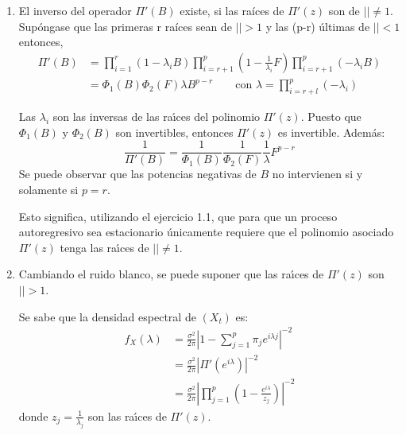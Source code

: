 \begin{observacion}
 
\begin{enumerate}
\item El inverso del operador $\Pi'(B)$ existe, si las ra\'{i}ces de $\Pi'(z)$ son de $\left| \right|\ne 1$. Sup\'{o}ngase que las primeras r ra\'{i}ces sean de $\left| \right|>1$ y las (p-r) \'{u}ltimas de $\left| \right|<1$
entonces, 
\begin{align*}
 \Pi'(B)
	 &=\prod_{i=1}^{r} (1-\lambda_{i} B)\prod_{i=r+1}^{p} \left( {1-\frac{1}{\lambda_{i} }F} \right)\prod_{i=r+1}^{p} (-\lambda_{i} B)\\
	 &=\Phi_{1} \left( B \right)\Phi_{2} (F)\lambda B^{p-r}\qquad\text{con }\lambda 
=\prod_{i=r+l}^{p} \left( {-\lambda_{i} } \right)
\end{align*}

Las $\lambda_{i}$ son las inversas de las ra\'{\i}ces del polinomio 
${\Pi }'\left( z \right)$. Puesto que $\Phi_{1} (B)$ y $\Phi_{2} 
(B)$ son invertibles, entonces $\Pi'(z)$ es invertible. Adem\'{a}s:
\[
\frac{1}{\Pi'(B)}=\frac{1}{\Phi_{1} (B)}\frac{1}{\Phi_{2} 
(F)}\frac{1}{\lambda }F^{p-r}
\]
Se puede observar que las potencias negativas de $B$ no intervienen si y 
solamente si $p=r$.

Esto significa, utilizando el ejercicio 1.1, que para que un proceso 
autoregresivo sea estacionario \'{u}nicamente requiere que el polinomio 
asociado ${\Pi }'\left( z \right)$ tenga las ra\'{\i}ces de 
$\left| \right|\ne 1$.

\item Cambiando el ruido blanco, se puede suponer que las ra\'{\i}ces de $\Pi'(z)$ son $\left| \right|>1$.

Se sabe que la densidad espectral de $(X_{{t}})$ es:
\begin{align*}
 f_{X} (\lambda )
	 &=\frac{\sigma^{2}}{2\pi }\left| {1-\sum_{j=1}^p {\pi_{j} e^{i\lambda j}} } \right|^{-2}\\
	 &=\frac{\sigma ^{2}}{2\pi }\left| {\Pi'(e^{i\lambda })} \right|^{-2}\\
	 &=\frac{\sigma^{2}}{2\pi }\left| {\prod_{j=1}^{p} \left({1-\frac{e^{i\lambda }}{z_{j} }} \right)} \right|^{-2}
\end{align*}
donde $z_{j} =\frac{1}{\lambda_{j} }$ son las ra\'{\i}ces de $\Pi'(z)$.


\end{enumerate}
\end{observacion}
